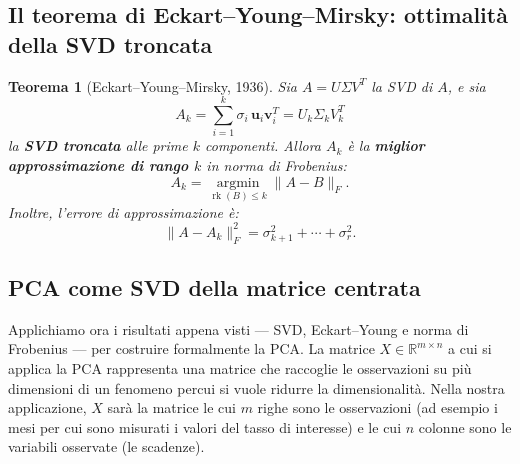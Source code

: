 \documentclass[11pt,a4paper]{article}
\theoremstyle{plain}
\newtheorem{teorema}{Teorema}[section]
\theoremstyle{definition}
\theoremstyle{remark}
\begin{document}
\subsection{Il teorema di Eckart--Young--Mirsky: ottimalità della SVD troncata}

\begin{teorema}[Eckart--Young--Mirsky, 1936]
\label{thm:ey}
Sia $A = U \Sigma V^T$ la SVD di $A$, e sia
\[
  A_k = \sum_{i=1}^{k} \sigma_i \, \mathbf{u}_i \mathbf{v}_i^T
  = U_k \Sigma_k V_k^T
\]
la \textbf{SVD troncata} alle prime $k$ componenti. Allora $A_k$ è la
\textbf{miglior approssimazione di rango $k$} in norma di Frobenius:
\[
  A_k = \operatorname*{argmin}_{\operatorname{rk}(B) \leq k} \|A - B\|_F.
\]
Inoltre, l'errore di approssimazione è:
\begin{equation}
  \|A - A_k\|_F^2 = \sigma_{k+1}^2 + \cdots + \sigma_r^2.
  \label{eq:ey_errore}
\end{equation}
\end{teorema}





\subsection{PCA come SVD della matrice centrata}

Applichiamo ora i risultati appena visti — SVD, Eckart–Young e norma di
Frobenius — per costruire formalmente la PCA. 
La matrice $X \in \mathbb{R}^{m \times n}$ a cui si applica la PCA rappresenta
una matrice che raccoglie le osservazioni su più dimensioni di un fenomeno percui si vuole ridurre la dimensionalità.
Nella nostra applicazione, $X$ sarà  la matrice le cui
$m$ righe sono le osservazioni (ad esempio i mesi per cui sono misurati i
valori del tasso di interesse) e le cui $n$ colonne sono le variabili
osservate (le scadenze). 
\end{document}
